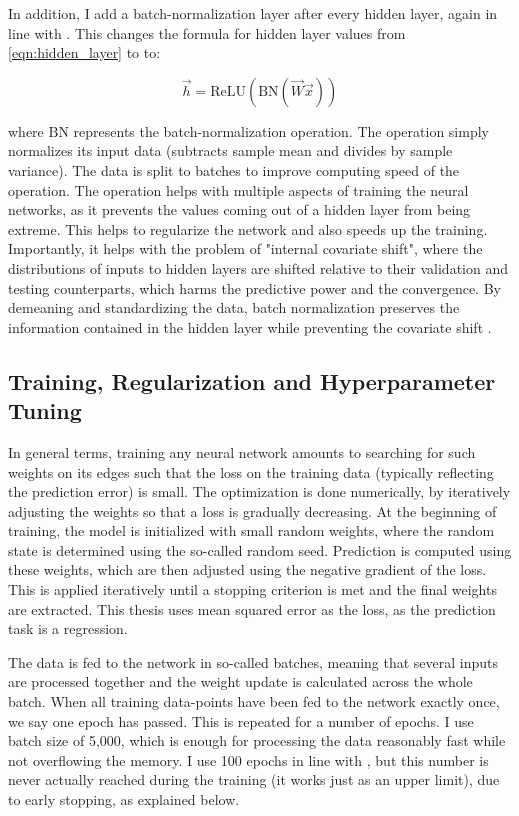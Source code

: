 		In addition, I add a batch-normalization layer \citep{ioffe2015batch} after every hidden layer, again in line with  \cite{gu2020empirical}. This changes the formula for hidden layer values from \ref{eqn:hidden_layer} to to: 
		
		\begin{equation}
			\vec{h} = \text{ReLU}(\text{BN}(\vec{W}\vec{x}))
		\end{equation}
		
		where $\text{BN}$ represents the batch-normalization operation. The operation simply normalizes its input data (subtracts sample mean and divides by sample variance). The data is split to batches to improve computing speed of the operation. The operation helps with multiple aspects of training the neural networks, as it prevents the values coming out of a hidden layer from being extreme. This helps to regularize the network and also speeds up the training. Importantly, it helps with the problem of "internal covariate shift", where the distributions of inputs to hidden layers are shifted relative to their validation and testing counterparts, which harms the predictive power and the convergence. By demeaning and standardizing the data, batch normalization preserves the information contained in the hidden layer while preventing the covariate shift \citep{ioffe2015batch}. 
	
	
	\subsection{Training, Regularization and Hyperparameter Tuning}
		\label{chap:train_regularize_tune}
	
		In general terms, training any neural network amounts to searching for such weights on its edges such that the loss on the training data (typically reflecting the prediction error) is small. The optimization is done numerically, by iteratively adjusting the weights so that a loss is gradually decreasing. At the beginning of training, the model is initialized with small random weights, where the random state is determined using the so-called random seed. Prediction is computed using these weights, which are then adjusted using the negative gradient of the loss. This is applied iteratively until a stopping criterion is met and the final weights are extracted. This thesis uses mean squared error as the loss, as the prediction task is a regression.
		
		The data is fed to the network in so-called batches, meaning that several inputs are processed together and the weight update is calculated across the whole batch. When all training data-points have been fed to the network exactly once, we say one epoch has passed. This is repeated for a number of epochs. I use batch size of 5,000, which is enough for processing the data reasonably fast while not overflowing the memory. I use 100 epochs in line with \cite{gu2020empirical}, but this number is never actually reached during the training (it works just as an upper limit), due to early stopping, as explained below.
		
